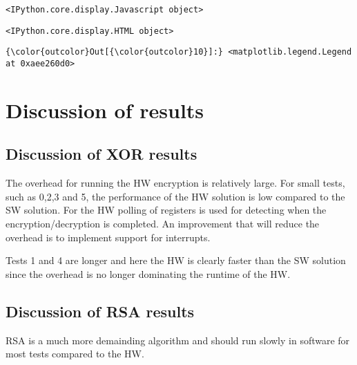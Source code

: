 \documentclass[11pt]{article}
\begin{document}
    
    \begin{verbatim}
<IPython.core.display.Javascript object>
    \end{verbatim}

    
    
    \begin{verbatim}
<IPython.core.display.HTML object>
    \end{verbatim}

    
\begin{Verbatim}[commandchars=\\\{\}]
{\color{outcolor}Out[{\color{outcolor}10}]:} <matplotlib.legend.Legend at 0xaee260d0>
\end{Verbatim}
            
    \section{Discussion of results}\label{discussion-of-results}

\subsection{Discussion of XOR results}\label{discussion-of-xor-results}

The overhead for running the HW encryption is relatively large. For
small tests, such as 0,2,3 and 5, the performance of the HW solution is
low compared to the SW solution. For the HW polling of registers is used
for detecting when the encryption/decryption is completed. An
improvement that will reduce the overhead is to implement support for
interrupts.

Tests 1 and 4 are longer and here the HW is clearly faster than the SW
solution since the overhead is no longer dominating the runtime of the
HW.

\subsection{Discussion of RSA results}\label{discussion-of-rsa-results}

RSA is a much more demainding algorithm and should run slowly in
software for most tests compared to the HW.


    
    
    
    
\end{document}
